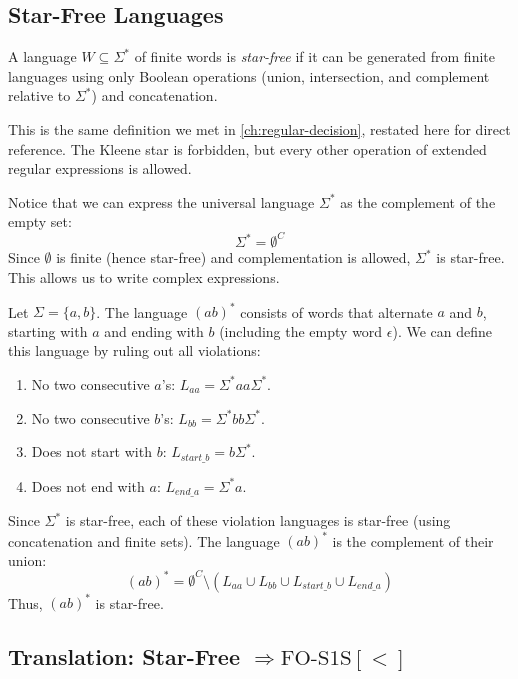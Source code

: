 \subsection{Star-Free Languages}
\label{subsec:star-free-def}

\begin{definition}
A language $W \subseteq \Sigma^*$ of finite words is \emph{star-free} if it can be generated from finite languages using only Boolean operations (union, intersection, and complement relative to $\Sigma^*$) and concatenation.
\end{definition}

This is the same definition we met in \cref{ch:regular-decision}, restated here for direct reference. The Kleene star is forbidden, but every other operation of extended regular expressions is allowed.

Notice that we can express the universal language $\Sigma^*$ as the complement of the empty set:
$$\Sigma^* = \emptyset^C$$
Since $\emptyset$ is finite (hence star-free) and complementation is allowed, $\Sigma^*$ is star-free. This allows us to write complex expressions.

\begin{example}
Let $\Sigma = \{a, b\}$. The language $(ab)^*$ consists of words that alternate $a$ and $b$, starting with $a$ and ending with $b$ (including the empty word $\epsilon$). We can define this language by ruling out all violations:
\begin{enumerate}
    \item No two consecutive $a$'s: $L_{aa} = \Sigma^* a a \Sigma^*$.
    \item No two consecutive $b$'s: $L_{bb} = \Sigma^* b b \Sigma^*$.
    \item Does not start with $b$: $L_{start\_b} = b \Sigma^*$.
    \item Does not end with $a$: $L_{end\_a} = \Sigma^* a$.
\end{enumerate}
Since $\Sigma^*$ is star-free, each of these violation languages is star-free (using concatenation and finite sets). The language $(ab)^*$ is the complement of their union:
$$(ab)^* = \emptyset^C \setminus \left( L_{aa} \cup L_{bb} \cup L_{start\_b} \cup L_{end\_a} \right)$$
Thus, $(ab)^*$ is star-free.
\end{example}

\subsection{Translation: Star-Free $\Longrightarrow \text{FO-S1S}[<]$}
\label{subsec:star-free-to-fo}

